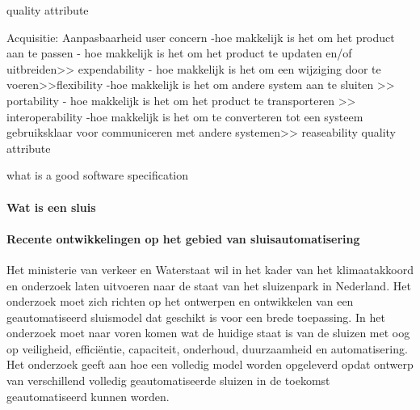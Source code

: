 quality attribute


Acquisitie: Aanpasbaarheid
user concern
-hoe makkelijk is het om het product aan te passen
- hoe makkelijk is het om het product te updaten en/of uitbreiden>> expendability
- hoe makkelijk is het om een wijziging door te voeren>>flexibility
-hoe makkelijk is het om andere system aan te sluiten >> portability
- hoe makkelijk is het om het product te transporteren >> interoperability
-hoe makkelijk is het om te converteren tot een systeem gebruiksklaar voor communiceren met andere systemen>> reaseability
quality attribute




 \cite{jonkerTreurKlush200informativeAgents}
\cite{boehmBoseLeeRequirementsNegotiations}
\cite{muHungJinLiu2013inconsistencyReqs}
\cite{hunterNuseibeh1996manageSpecs}
\cite{myloloupos1992representingReqs}
\cite{zavePamela4darkCorners}
\cite{zavePAmela1997regEngineering}


what is a good software specification

\cite{fvaandrager2322010Goodmodel}
\cite{onix01102022devopmodel}
\cite{sulemani04012021softwareprocesmodel}
\cite{globalluxsoft18102017softdev}
\cite{wiegers30052022SRS}
\cite{muller06092020goodspecification}
\cite{informit30062008reqmanagement}
\cite{altexsoft15092020writingSRS}


\paragraph{Wat is een sluis}

\paragraph{Recente ontwikkelingen op het gebied van sluisautomatisering}

Het ministerie van verkeer en Waterstaat wil in het kader van het klimaatakkoord en onderzoek laten uitvoeren naar de staat van het sluizenpark in Nederland. Het onderzoek moet zich richten op het ontwerpen en ontwikkelen van een geautomatiseerd sluismodel dat geschikt is voor een brede toepassing. In het onderzoek moet naar voren komen wat de huidige staat is van de sluizen met oog op veiligheid, efficiëntie, capaciteit, onderhoud, duurzaamheid en automatisering. Het onderzoek geeft aan hoe een volledig model worden opgeleverd opdat ontwerp van verschillend volledig geautomatiseerde sluizen in de toekomst geautomatiseerd kunnen worden.  


